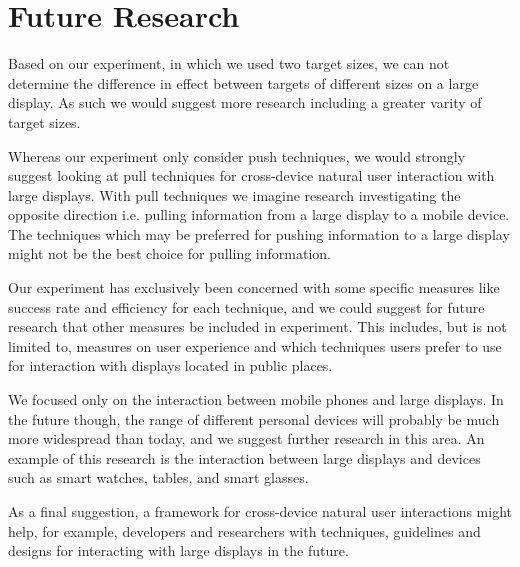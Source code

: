 \section{Future Research} \label{sec:futureresearch}
Based on our experiment, in which we used two target sizes, we can not determine the difference in effect between targets of different sizes on a large display. As such we would suggest more research including a greater varity of target sizes.

Whereas our experiment only consider push techniques, we would strongly suggest looking at pull techniques for cross-device natural user interaction with large displays.
With pull techniques we imagine research investigating the opposite direction i.e. pulling information from a large display to a mobile device.
The techniques which may be preferred for pushing information to a large display might not be the best choice for pulling information.

Our experiment has exclusively been concerned with some specific measures like success rate and efficiency for each technique, and we could suggest for future research that other measures be included in experiment.
This includes, but is not limited to, measures on user experience and which techniques users prefer to use for interaction with displays located in public places.

We focused only on the interaction between mobile phones and large displays.
In the future though, the range of different personal devices will probably be much more widespread than today, and we suggest further research in this area.
An example of this research is the interaction between large displays and devices such as smart watches, tables, and smart glasses.

As a final suggestion, a framework for cross-device natural user interactions might help, for example, developers and researchers with techniques, guidelines and designs for interacting with large displays in the future.